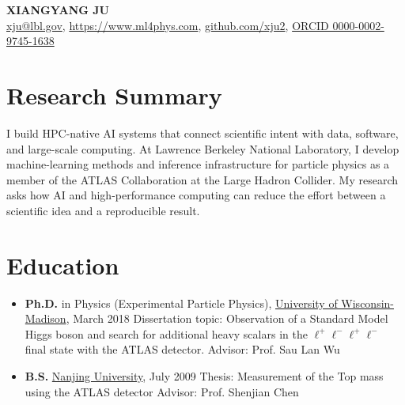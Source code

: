 \documentclass[a4paper, 12pt]{extarticle}
\newcommand\llll{\ensuremath{\ell^+\ell^-\ell^+\ell^-}\xspace}
\begin{document}

\begin{centering}
    \textbf{\Large{XIANGYANG JU}} \\
    \vspace{0.3cm}
    \href{mailto:xju@lbl.gov}{xju@lbl.gov}, \href{https://www.ml4phys.com}{https://www.ml4phys.com}, \href{https://github.com/xju2}{github.com/xju2}, \href{https://orcid.org/0000-0002-9745-1638}{ORCID 0000-0002-9745-1638} \\
\end{centering}

\section*{Research Summary}
I build HPC-native AI systems that connect scientific intent with data, software, and large-scale computing. At Lawrence Berkeley National Laboratory, I develop machine-learning methods and inference infrastructure for particle physics as a member of the ATLAS Collaboration at the Large Hadron Collider. My research asks how AI and high-performance computing can reduce the effort between a scientific idea and a reproducible result.

\section*{Education}

\begin{itemize}
    \item[] \textbf{Ph.D.} in Physics (Experimental Particle Physics), \href{http://www.wisc.edu}{University of Wisconsin-Madison}, March 2018
\newline \indent Dissertation topic: Observation of a Standard Model Higgs boson and search for additional heavy scalars in the $\llll$ final state with the ATLAS detector.
\newline \indent Advisor: Prof. Sau Lan Wu
    \item[] \textbf{B.S.} \href{http://www.nju.edu.cn/}{Nanjing University},   July 2009
\newline \indent Thesis: Measurement of the Top mass using the ATLAS detector
\newline \indent Advisor: Prof. Shenjian Chen
\end{itemize}
\end{document}
